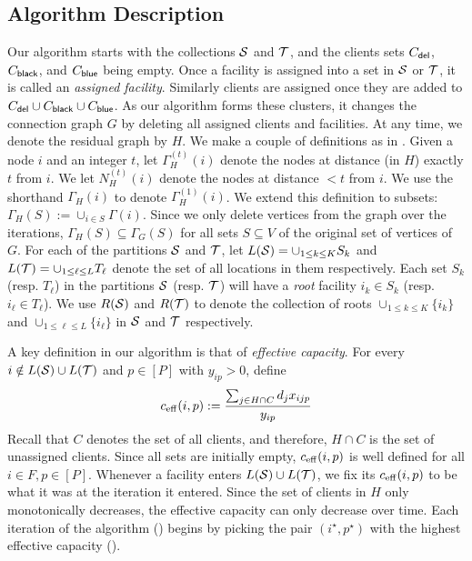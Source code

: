 \subsection{Algorithm Description}
Our algorithm starts with the collections ${\cal S}$ and ${\cal T}$, and the clients sets $C_{\mathsf{del}}$, $C_{\mathsf{black}}$, and $C_{\mathsf{blue}}$ being empty. Once a facility is assigned into a set in ${\cal S}$ or ${\cal T}$, it is called an \emph{assigned facility}. Similarly clients are assigned once they are added to $C_{\mathsf{del}} \cup C_{\mathsf{black}} \cup C_{\mathsf{blue}}$.
As our algorithm forms these clusters, it changes the connection graph $G$ by deleting all assigned clients and facilities. At any time, we denote the residual graph by $H$.
We make a couple of definitions as in . Given a node $i$ and an integer $t$, let $\Gamma^{(t)}_H(i)$ denote the nodes at distance (in $H$) exactly $t$ from $i$. We let $N^{(t)}_H(i)$ denote the nodes at distance $< t$ from $i$.
We use the shorthand $\Gamma_H(i)$ to denote $\Gamma^{(1)}_H(i)$. We extend this definition to subsets: $\Gamma_H(S) := \cup_{i\in S}\Gamma(i)$.
Since we only delete vertices from the graph over the iterations, $\Gamma_H(S) \subseteq \Gamma_G(S)$ for all sets $S \subseteq V$ of the original set of vertices of $G$.
For each of the partitions ${\cal S}$ and ${\cal T}$, let $L({\cal S}) = \cup_{1\leq k \leq K} S_k$ and $L({\cal T}) = \cup_{1 \leq \ell \leq L} T_\ell$ denote the set of all locations in them respectively.
Each set $S_k$ (resp. $T_\ell$) in the partitions ${\cal S}$ (resp. ${\cal T}$) will have a {\em root} facility $i_k \in S_k$ (resp. $i_\ell \in T_\ell$). We use $R({\cal S})$ and $R({\cal T})$ to denote the collection of roots $\cup_{1 \leq k \leq K} \{i_k\}$ and $\cup_{1 \leq \ell \leq L} \{i_\ell\}$ in ${\cal S}$ and ${\cal T}$ respectively. \smallskip




A key definition in our algorithm is that of {\em effective capacity}. For every $i\notin L({\cal S})\cup L({\cal T})$ and $p\in [P]$ with $y_{ip} > 0$, define
\[
c_{\mathrm{eff}}(i,p) := \frac{\sum_{j\in H \cap C} d_j x_{ijp}}{y_{ip}}
\]
Recall that $C$ denotes the set of all clients, and therefore, $H \cap C$ is the set of unassigned clients.
Since all sets
 are initially empty, $c_{\mathrm{eff}}(i,p)$ is well defined for all $i\in F, p\in [P]$. Whenever a facility enters $L({\cal S})\cup L({\cal T})$, we fix its $c_{\mathrm{eff}}(i,p)$ to be what it was at the iteration it entered.
Since the set of clients in $H$ only monotonically decreases, the effective capacity can only decrease over time. Each iteration of the algorithm () begins by picking the pair $(i^\star, p^\star)$ with the highest
effective capacity (). %

